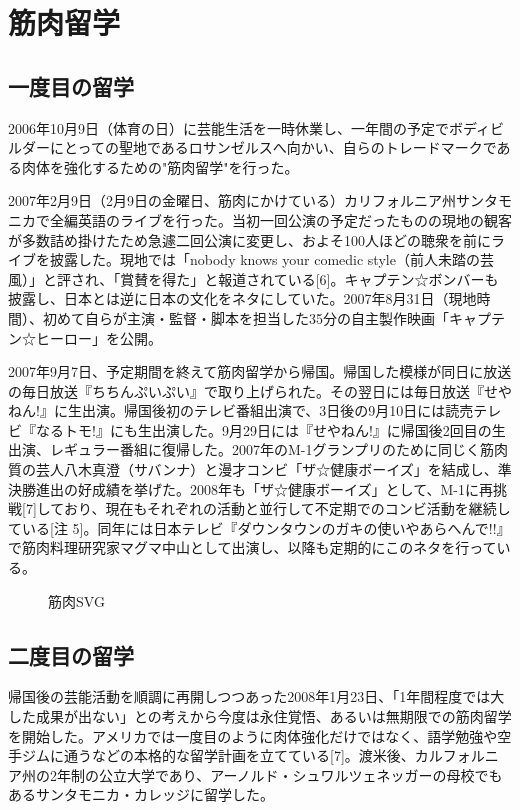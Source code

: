 \section{筋肉留学}
\subsection{一度目の留学}
2006年10月9日（体育の日）に芸能生活を一時休業し、一年間の予定でボディビルダーにとっての聖地であるロサンゼルスへ向かい、自らのトレードマークである肉体を強化するための"筋肉留学"を行った。

2007年2月9日（2月9日の金曜日、筋肉にかけている）カリフォルニア州サンタモニカで全編英語のライブを行った。当初一回公演の予定だったものの現地の観客が多数詰め掛けたため急遽二回公演に変更し、およそ100人ほどの聴衆を前にライブを披露した。現地では「nobody knows your comedic style（前人未踏の芸風）」と評され、「賞賛を得た」と報道されている[6]。キャプテン☆ボンバーも披露し、日本とは逆に日本の文化をネタにしていた。2007年8月31日（現地時間）、初めて自らが主演・監督・脚本を担当した35分の自主製作映画「キャプテン☆ヒーロー」を公開。

2007年9月7日、予定期間を終えて筋肉留学から帰国。帰国した模様が同日に放送の毎日放送『ちちんぷいぷい』で取り上げられた。その翌日には毎日放送『せやねん!』に生出演。帰国後初のテレビ番組出演で、3日後の9月10日には読売テレビ『なるトモ!』にも生出演した。9月29日には『せやねん!』に帰国後2回目の生出演、レギュラー番組に復帰した。2007年のM-1グランプリのために同じく筋肉質の芸人八木真澄（サバンナ）と漫才コンビ「ザ☆健康ボーイズ」を結成し、準決勝進出の好成績を挙げた。2008年も「ザ☆健康ボーイズ」として、M-1に再挑戦[7]しており、現在もそれぞれの活動と並行して不定期でのコンビ活動を継続している[注 5]。同年には日本テレビ『ダウンタウンのガキの使いやあらへんで!!』で筋肉料理研究家マグマ中山として出演し、以降も定期的にこのネタを行っている。

\begin{figure}[htbp]
  \centering
  
  \caption{筋肉SVG}
  \label{fig:my_label}
\end{figure}

\subsection{二度目の留学}
帰国後の芸能活動を順調に再開しつつあった2008年1月23日、「1年間程度では大した成果が出ない」との考えから今度は永住覚悟、あるいは無期限での筋肉留学を開始した。アメリカでは一度目のように肉体強化だけではなく、語学勉強や空手ジムに通うなどの本格的な留学計画を立てている[7]。渡米後、カルフォルニア州の2年制の公立大学であり、アーノルド・シュワルツェネッガーの母校でもあるサンタモニカ・カレッジに留学した。

